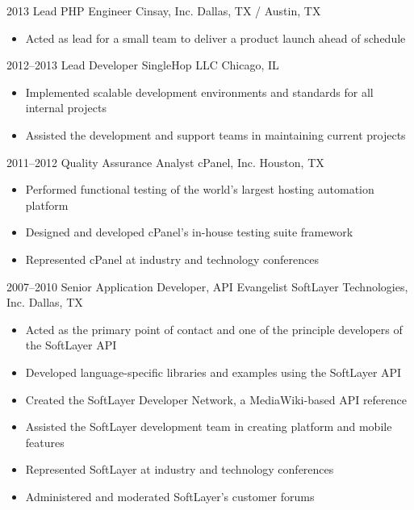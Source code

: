 \documentclass[11pt,a4paper,sans]{moderncv}
\begin{document}
    \cventry
      {2013}
      {Lead PHP Engineer}
      {Cinsay, Inc.}
      {Dallas, TX / Austin, TX}
      {}
      {
        \begin{itemize}
          \item Acted as lead for a small team to deliver a product launch ahead of schedule
        \end{itemize}
      }

    \cventry
      {2012--2013}
      {Lead Developer}
      {SingleHop LLC}
      {Chicago, IL}
      {}
      {
        \begin{itemize}
          \item Implemented scalable development environments and standards for all internal projects
          \item Assisted the development and support teams in maintaining current projects
        \end{itemize}
      }

    \cventry
      {2011--2012}
      {Quality Assurance Analyst}
      {cPanel, Inc.}
      {Houston, TX}
      {}
      {
        \begin{itemize}
          \item Performed functional testing of the world's largest hosting automation platform
          \item Designed and developed cPanel's in-house testing suite framework
          \item Represented cPanel at industry and technology conferences
        \end{itemize}
      }

    \cventry
      {2007--2010}
      {Senior Application Developer, API Evangelist}
      {SoftLayer Technologies, Inc.}
      {Dallas, TX}
      {}
      {
        \begin{itemize}
          \item Acted as the primary point of contact and one of the principle developers of the SoftLayer API
          \item Developed language-specific libraries and examples using the SoftLayer API
          \item Created the SoftLayer Developer Network, a MediaWiki-based API reference
          \item Assisted the SoftLayer development team in creating platform and mobile features
          \item Represented SoftLayer at industry and technology conferences
          \item Administered and moderated SoftLayer's customer forums
        \end{itemize}
      }
\end{document}
